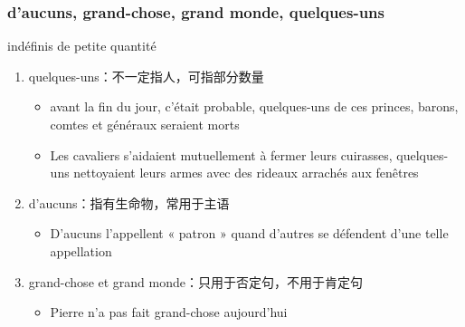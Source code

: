\documentclass[UTF8]{report}
\begin{document}
\subsubsection{d’aucuns, grand-chose, grand monde, quelques-uns}
indéfinis de petite quantité
\begin{enumerate}
    \item quelques-uns：不一定指人，可指部分数量
    \begin{itemize}
        \item avant la fin du jour, c’était probable, quelques-uns de ces princes, barons, comtes et généraux seraient morts
        \item Les cavaliers s’aidaient mutuellement à fermer leurs cuirasses, quelques-uns nettoyaient leurs armes avec des rideaux arrachés aux fenêtres
    \end{itemize}
    \item d’aucuns：指有生命物，常用于主语
    \begin{itemize}
        \item D’aucuns l’appellent « patron » quand d’autres se défendent d’une telle appellation
    \end{itemize}
    \item grand-chose et grand monde：只用于否定句，不用于肯定句
    \begin{itemize}
        \item Pierre n’a pas fait grand-chose aujourd’hui
    \end{itemize}
\end{enumerate}
\end{document}
